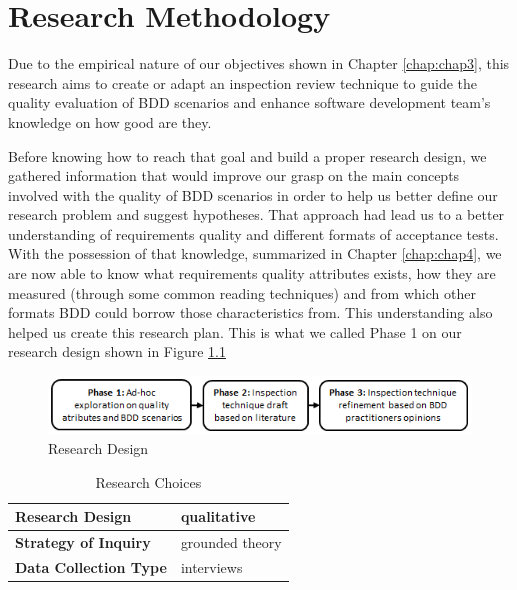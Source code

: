 \chapter{\label{chap:chap5}{Research Methodology}}

Due to the empirical nature of our objectives shown in Chapter \ref{chap:chap3}, this research aims to create or adapt an inspection review technique to guide the quality evaluation of BDD scenarios and enhance software development team's knowledge on how good are they. 

Before knowing how to reach that goal and build a proper research design, we gathered information that would improve our grasp on the main concepts involved with the quality of BDD scenarios in order to help us better define our research problem and suggest hypotheses. That approach had lead us to a better understanding of requirements quality and different formats of acceptance tests. With the possession of that knowledge, summarized in Chapter \ref{chap:chap4}, we are now able to know what requirements quality attributes exists, how they are measured (through some common reading techniques) and from which other formats BDD could borrow those characteristics from. This understanding also helped us create this research plan. This is what we called Phase 1 on our research design shown in Figure \ref{fig:design}

\begin{figure}[h!]
\centering
\includegraphics[scale=0.9]{images/Research-Plan}
\caption{Research Design}
\label{fig:design}
\end{figure}

\begin{table}[!b]
\renewcommand{\arraystretch}{1.3}
\caption{Research Choices}
\label{tbl:research_design}
\centering
\begin{tabular}{|m{6cm}|m{6cm}|}
\hline
 \textbf{Research Design} & qualitative\\
 \hline
 \textbf{Strategy of Inquiry} & grounded theory\\
 \hline
 \textbf{Data Collection Type} & interviews\\
\hline
\end{tabular}
\end{table}

